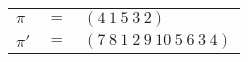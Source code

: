 \begin{example}\label{example:QJCKPQSS}
  \hfill \break
  \begin{tabular}{lll}
    $\pi$  & $=$ & $(4~1~5~3~2)$ \\
    $\pi'$ & $=$ & $(7~8~1~2~9~10~5~6~3~4)$ \\
  \end{tabular}
\end{example}